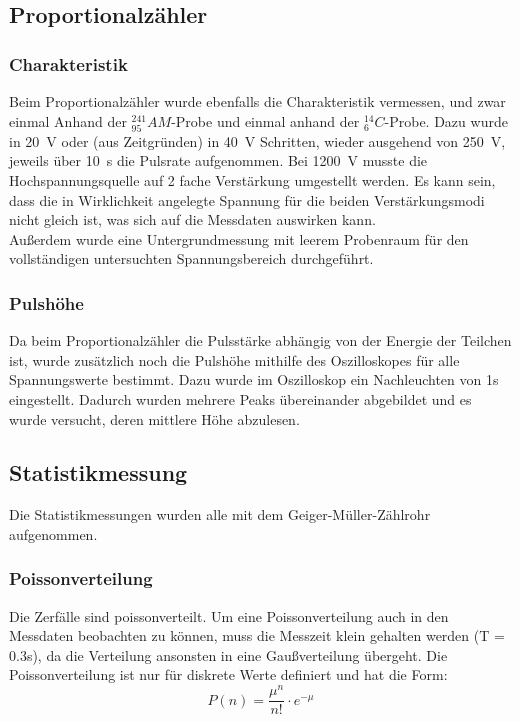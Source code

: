 \documentclass[12pt,a4paper]{article}
\begin{document}
\subsection{Proportionalzähler}

\subsubsection{Charakteristik}
Beim Proportionalzähler wurde ebenfalls die Charakteristik vermessen, und zwar einmal Anhand der $_{95}^{241}AM$-Probe und einmal anhand der $_6^{14}C$-Probe. Dazu wurde in \SI{20}{V} oder (aus Zeitgründen) in \SI{40}{V} Schritten, wieder ausgehend von \SI{250}{V}, jeweils über \SI{10}{s} die Pulsrate aufgenommen. Bei \SI{1200}{V} musste die Hochspannungsquelle auf 2 fache Verstärkung umgestellt werden. Es kann sein, dass die in Wirklichkeit angelegte Spannung für die beiden Verstärkungsmodi nicht gleich ist, was sich auf die Messdaten auswirken kann.\\
Außerdem wurde eine Untergrundmessung mit leerem Probenraum für den vollständigen untersuchten Spannungsbereich durchgeführt.

\subsubsection{Pulshöhe}
Da beim Proportionalzähler die Pulsstärke abhängig von der Energie der Teilchen ist, wurde zusätzlich noch die Pulshöhe mithilfe des Oszilloskopes für alle Spannungswerte bestimmt. Dazu wurde im Oszilloskop ein Nachleuchten von 1s eingestellt. Dadurch wurden mehrere Peaks übereinander abgebildet und es wurde versucht, deren mittlere Höhe abzulesen.

\subsection{Statistikmessung}
Die Statistikmessungen wurden alle mit dem Geiger-Müller-Zählrohr aufgenommen.
\subsubsection{Poissonverteilung}
Die Zerfälle sind poissonverteilt. Um eine Poissonverteilung auch in den Messdaten beobachten zu können, muss die Messzeit klein gehalten werden (T = 0.3s), da die Verteilung ansonsten in eine Gaußverteilung übergeht. Die Poissonverteilung ist nur für diskrete Werte definiert und hat die Form:
\begin{equation}
P(n) = \dfrac{\mu ^n}{n!} \cdot e^{-\mu}
\end{equation}
\end{document}
